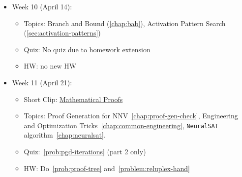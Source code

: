 \documentclass[oneside,11pt,dvipsnames]{book}
\numberwithin{equation}{section}
\theoremstyle{definition}
\theoremstyle{remark}
\newcommand{\reluplex}{\texttt{Reluplex}}
\newcommand{\neuralsat}{\texttt{NeuralSAT}}
\begin{document}
\begin{itemize}
%         
%       
    \item Week 10 (April 14):
    \begin{itemize}
        \item Topics: Branch and Bound (\autoref{chap:bab}), Activation Pattern Search (\autoref{sec:activation-patterns})
        \item Quiz: No quiz due to homework extension
        \item HW: no new HW
    \end{itemize}

    \item Week 11 (April 21):
    \begin{itemize}
        \item Short Clip: \href{https://www.youtube.com/watch?v=YYgepDY3rHw}{Mathematical Proofs}
        \item Topics: Proof Generation for NNV~\autoref{chap:proof-gen-check}, Engineering and Optimization Tricks~\autoref{chap:common-engineering}, \neuralsat{} algorithm~\autoref{chap:neuralsat}. %
        \item Quiz:~\autoref{prob:pgd-iterations} (part 2 only)
        \item HW: Do~\autoref{prob:proof-tree}  and~\autoref{problem:reluplex-hand}
    \end{itemize}        


\end{itemize}
\end{document}

